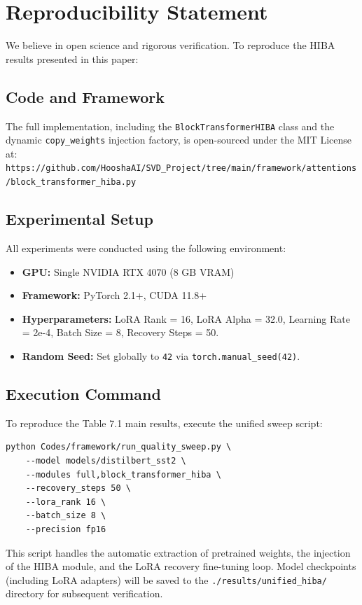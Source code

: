 \section{Reproducibility Statement}

We believe in open science and rigorous verification. To reproduce the HIBA results presented in this paper:

\subsection{Code and Framework}
The full implementation, including the \texttt{BlockTransformerHIBA} class and the dynamic \texttt{copy\_weights} injection factory, is open-sourced under the MIT License at:
\texttt{https://github.com/HooshaAI/SVD\_Project/tree/main/framework/attentions/block\_transformer\_hiba.py}

\subsection{Experimental Setup}
All experiments were conducted using the following environment:
\begin{itemize}
\item \textbf{GPU:} Single NVIDIA RTX 4070 (8 GB VRAM)
\item \textbf{Framework:} PyTorch 2.1+, CUDA 11.8+
\item \textbf{Hyperparameters:} LoRA Rank = 16, LoRA Alpha = 32.0, Learning Rate = 2e-4, Batch Size = 8, Recovery Steps = 50.
\item \textbf{Random Seed:} Set globally to \texttt{42} via \texttt{torch.manual\_seed(42)}.

\end{itemize}
\subsection{Execution Command}
To reproduce the Table 7.1 main results, execute the unified sweep script:
\begin{lstlisting}
python Codes/framework/run_quality_sweep.py \
    --model models/distilbert_sst2 \
    --modules full,block_transformer_hiba \
    --recovery_steps 50 \
    --lora_rank 16 \
    --batch_size 8 \
    --precision fp16

\end{lstlisting}

This script handles the automatic extraction of pretrained weights, the injection of the HIBA module, and the LoRA recovery fine-tuning loop. Model checkpoints (including LoRA adapters) will be saved to the \texttt{./results/unified\_hiba/} directory for subsequent verification.

